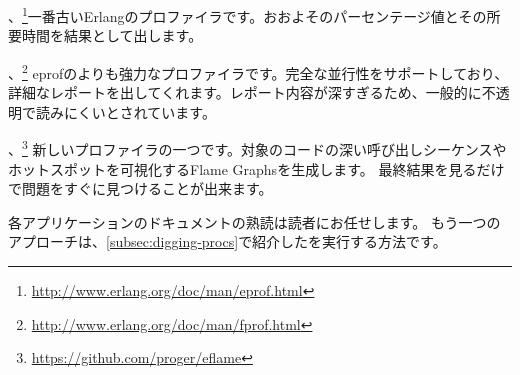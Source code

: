 \begin{itemize*}
 \item {}、\footnote{\href{http://www.erlang.org/doc/man/eprof.html}{http://www.erlang.org/doc/man/eprof.html}}一番古いErlangのプロファイラです。おおよそのパーセンテージ値とその所要時間を結果として出します。
	\item {}、\footnote{\href{http://www.erlang.org/doc/man/fprof.html}{http://www.erlang.org/doc/man/fprof.html}}
eprofのよりも強力なプロファイラです。完全な並行性をサポートしており、詳細なレポートを出してくれます。レポート内容が深すぎるため、一般的に不透明で読みにくいとされています。

  \item {}、\footnote{\href{https://github.com/proger/eflame}{https://github.com/proger/eflame}}
新しいプロファイラの一つです。対象のコードの深い呼び出しシーケンスやホットスポットを可視化するFlame Graphsを生成します。
最終結果を見るだけで問題をすぐに見つけることが出来ます。

\end{itemize*}

各アプリケーションのドキュメントの熟読は読者にお任せします。
もう一つのアプローチは、\ref{subsec:digging-procs}で紹介したを実行する方法です。

